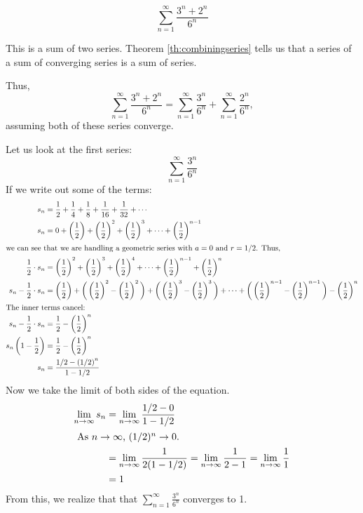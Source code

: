 \begin{ex}
  \[ \sum_{n=1}^{\infty} \frac{3^n+2^n}{6^n} \]
  \begin{sol}
    This is a sum of two series. Theorem \ref{th:combiningseries} tells us that
    a series of a sum of converging series is a sum of series.

    Thus,
    \[ \sum_{n=1}^{\infty} \frac{3^n+2^n}{6^n}=\sum_{n=1}^\infty
      \frac{3^n}{6^n} + \sum_{n=1}^\infty \frac{2^n}{6^n}, \]
    assuming both of these series converge.

    Let us look at the first series:
    \[ \sum_{n=1}^\infty \frac{3^n}{6^n} \]
    If we write out some of the terms:
    \begin{align*}
      s_n
      &=\frac{1}{2}+\frac{1}{4}+\frac{1}{8}+\frac{1}{16}+\frac{1}{32} + \cdots
      \\
      s_n &=0+\left( \frac{1}{2} \right) + \left( \frac{1}{2} \right)^2 + \left(
      \frac{1}{2} \right)^3 + \cdots + \left( \frac{1}{2} \right)^{n-1} \\
      \intertext{we can see that we are handling a geometric series with $a=0$
      and $r=1/2$. Thus,}
      \frac{1}{2}\cdot s_n &= \left( \frac{1}{2} \right)^2 + \left( \frac{1}{2} \right)^3 + \left(
      \frac{1}{2} \right)^4 + \cdots + \left( \frac{1}{2} \right)^{n-1} + \left(
      \frac{1}{2} \right)^n \\
      s_n - \frac{1}{2} \cdot s_n &=\left( \frac{1}{2} \right)+{\bigg(
        \left( \frac{1}{2} \right)^2 - \left( \frac{1}{2} \right)^2 \bigg) +
        \bigg( \left( \frac{1}{2} \right)^3 - \left( \frac{1}{2} \right)^3
        \bigg) + \cdots + \bigg( \left( \frac{1}{2} \right)^{n-1} -\left(
        \frac{1}{2} \right)^{n-1} \bigg)} - \left( \frac{1}{2} \right)^n \\
        \intertext{The inner terms cancel:}
        s_n - \frac{1}{2} \cdot s_n &= \frac{1}{2}-\left( \frac{1}{2} \right)^n
        \\
        s_n \left( 1 - \frac{1}{2} \right) &= \frac{1}{2} -\left(
        \frac{1}{2}\right)^n \\
        s_n &=\frac{1/2-\left(1/2\right)^n}{1 - 1/2} \\
      \end{align*}
        Now we take the limit of both sides of the equation.
      \begin{align*}
        \lim_{n\to\infty} s_n &=\lim_{n\to\infty}\frac{1/2 - 0}{1 - 1/2} \\
        \intertext{
          As $n \to \infty$, $(1/2)^n \to 0$.
        }
        &=\lim_{n\to\infty}\frac{1}{2(1-1/2)}
        =\lim_{n\to\infty} \frac{1}{2-1}
        =\lim_{n\to\infty} \frac{1}{1} \\
        &=1
    \end{align*}
    From this, we realize that that
    \( \sum_{n=1}^\infty \frac{3^n}{6^n} \)
    converges to 1.


\end{sol}
\end{ex}
